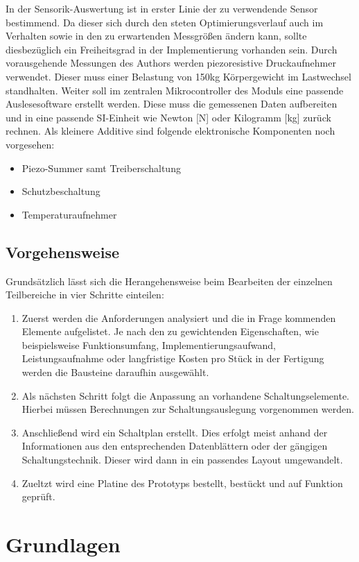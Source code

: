 \documentclass[12pt]{scrreprt} %
\begin{document}
In der Sensorik-Auswertung ist in erster Linie der zu verwendende Sensor bestimmend. Da dieser sich durch den steten Optimierungsverlauf auch im Verhalten sowie in den zu erwartenden Messgrößen ändern kann, sollte diesbezüglich ein Freiheitsgrad in der Implementierung vorhanden sein. Durch vorausgehende Messungen des Authors werden piezoresistive Druckaufnehmer verwendet. Dieser muss einer Belastung von 150kg Körpergewicht im Lastwechsel standhalten. Weiter soll im zentralen Mikrocontroller des Moduls eine passende Auslesesoftware erstellt werden. Diese muss die gemessenen Daten aufbereiten und in eine passende SI-Einheit wie Newton [N] oder Kilogramm [kg] zurück rechnen. Als kleinere Additive sind folgende elektronische Komponenten noch vorgesehen: 
\begin{itemize}
\item
Piezo-Summer samt Treiberschaltung
\item
Schutzbeschaltung
\item
Temperaturaufnehmer
\end{itemize}
\section{Vorgehensweise}
Grundsätzlich lässt sich die Herangehensweise beim Bearbeiten der einzelnen Teilbereiche in vier Schritte einteilen:
\begin{enumerate}
\item
Zuerst werden die Anforderungen analysiert und die in Frage kommenden Elemente aufgelistet. Je nach den zu gewichtenden Eigenschaften, wie beispielsweise Funktionsumfang, Implementierungsaufwand, Leistungsaufnahme oder langfristige Kosten pro Stück in der Fertigung werden die Bausteine daraufhin ausgewählt.
\item
Als nächsten Schritt folgt die Anpassung an vorhandene Schaltungselemente. Hierbei müssen Berechnungen zur Schaltungsauslegung vorgenommen werden. 
\item
Anschließend wird ein Schaltplan erstellt. Dies erfolgt meist anhand der Informationen aus den entsprechenden Datenblättern oder der gängigen Schaltungstechnik. Dieser wird dann in ein passendes Layout umgewandelt. 
\item
Zueltzt wird eine Platine des Prototyps bestellt, bestückt und auf Funktion geprüft. 
\end{enumerate}
\chapter{Grundlagen}
\end{document}
